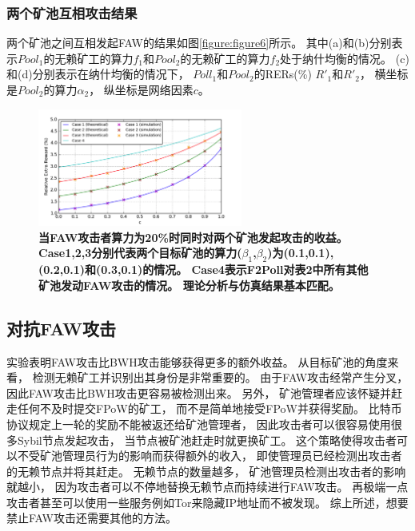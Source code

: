 \documentclass[a4paper, 11pt]{article}
\begin{document}
\begin{CJK*}{UTF8}{gbsn}
    \subsubsection{两个矿池互相攻击结果}

    \indent

    两个矿池之间互相发起FAW的结果如图\ref{figure:figure6}所示。
    其中(a)和(b)分别表示$Pool_1$的无赖矿工的算力$f_1$和$Pool_2$的无赖矿工的算力$f_2$处于纳什均衡的情况。
    (c)和(d)分别表示在纳什均衡的情况下，
    $Poll_1$和$Pool_2$的RERs(\%) $R'_1$和$R'_2$，
    横坐标是$Pool_2$的算力$\alpha_2$，
    纵坐标是网络因素$c$。

    \begin{figure}[h]
        \centering
        \includegraphics[width=0.6\textwidth]{figure4}
        \caption{\textbf{当FAW攻击者算力为20\%时同时对两个矿池发起攻击的收益。
        Case1,2,3分别代表两个目标矿池的算力($\beta_1$,$\beta_2$)为(0.1,0.1),(0.2,0.1)和(0.3,0.1)的情况。
        Case4表示F2Poll对表2中所有其他矿池发动FAW攻击的情况。
        理论分析与仿真结果基本匹配。}}
        \label{figure:figure4}
    \end{figure}

    \subsection{对抗FAW攻击}

    \indent

    实验表明FAW攻击比BWH攻击能够获得更多的额外收益。
    从目标矿池的角度来看，
    检测无赖矿工并识别出其身份是非常重要的。
    由于FAW攻击经常产生分叉，
    因此FAW攻击比BWH攻击更容易被检测出来。
    另外，
    矿池管理者应该怀疑并赶走任何不及时提交FPoW的矿工，
    而不是简单地接受FPoW并获得奖励。
    比特币协议规定上一轮的奖励不能被返还给矿池管理者，
    因此攻击者可以很容易使用很多Sybil节点发起攻击，
    当节点被矿池赶走时就更换矿工。
    这个策略使得攻击者可以不受矿池管理员行为的影响而获得额外的收入，
    即使管理员已经检测出攻击者的无赖节点并将其赶走。
    无赖节点的数量越多，
    矿池管理员检测出攻击者的影响就越小，
    因为攻击者可以不停地替换无赖节点而持续进行FAW攻击。
    再极端一点攻击者甚至可以使用一些服务例如Tor来隐藏IP地址而不被发现。
    综上所述，想要禁止FAW攻击还需要其他的方法。


\end{CJK*}
\end{document}
